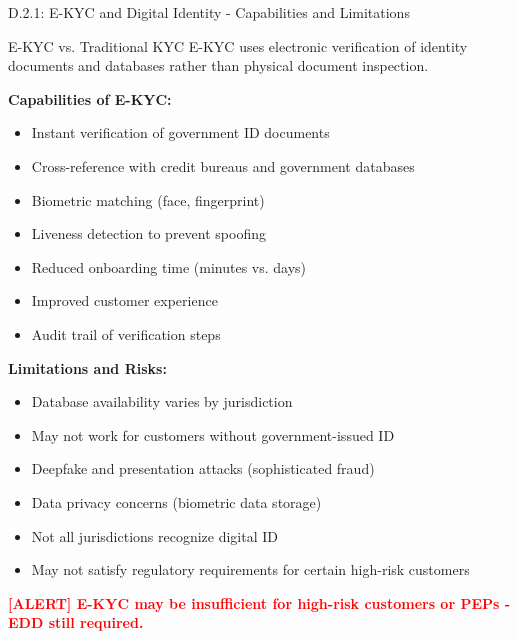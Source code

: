 \documentclass[11pt,a4paper]{beamer}
\newcommand{\redflag}[1]{\textcolor{red}{\textbf{[ALERT] #1}}}
\begin{document}
\begin{frame}{D.2.1: E-KYC and Digital Identity - Capabilities and Limitations}
	\begin{block}{E-KYC vs. Traditional KYC}
		E-KYC uses electronic verification of identity documents and databases rather than physical document inspection.
	\end{block}
	\textbf{Capabilities of E-KYC:}
	\begin{itemize}
		\item Instant verification of government ID documents
		\item Cross-reference with credit bureaus and government databases
		\item Biometric matching (face, fingerprint)
		\item Liveness detection to prevent spoofing
		\item Reduced onboarding time (minutes vs. days)
		\item Improved customer experience
		\item Audit trail of verification steps
	\end{itemize}
	\textbf{Limitations and Risks:}
	\begin{itemize}
		\item Database availability varies by jurisdiction
		\item May not work for customers without government-issued ID
		\item Deepfake and presentation attacks (sophisticated fraud)
		\item Data privacy concerns (biometric data storage)
		\item Not all jurisdictions recognize digital ID
		\item May not satisfy regulatory requirements for certain high-risk customers
	\end{itemize}
	\redflag{E-KYC may be insufficient for high-risk customers or PEPs - EDD still required.}
\end{frame}
\end{document}
